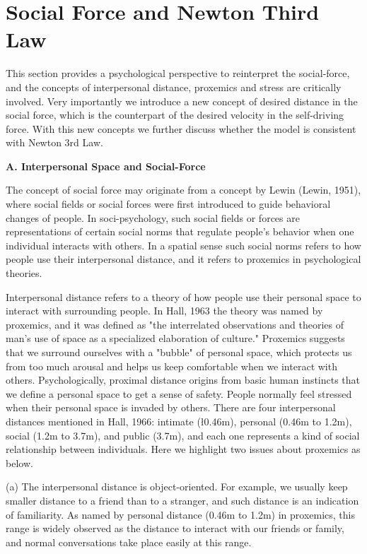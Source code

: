 \documentclass{article}
\begin{document}
\section{Social Force and Newton Third Law}

This section provides a psychological perspective to reinterpret the social-force, and the concepts of interpersonal distance, proxemics and stress are critically involved.  Very importantly we introduce a new concept of desired distance in the social force, which is the counterpart of the desired velocity in the self-driving force.  With this new concepts we further discuss whether the model is consistent with Newton 3rd Law.


\noindent \textbf{ A. Interpersonal Space and Social-Force}

The concept of social force may originate from a concept by Lewin (Lewin, 1951), where social fields or social forces were first introduced to guide behavioral changes of people.  In soci-psychology, such social fields or forces are representations of certain social norms that regulate people's behavior when one individual interacts with others.  In a spatial sense such social norms refers to how people use their interpersonal distance, and it refers to proxemics in psychological theories.

Interpersonal distance refers to a theory of how people use their personal space to interact with surrounding people.  In Hall, 1963 the theory was named by proxemics, and it was defined as "the interrelated observations and theories of man's use of space as a specialized elaboration of culture."  Proxemics suggests that we surround ourselves with a "bubble" of personal space, which protects us from too much arousal and helps us keep comfortable when we interact with others.  Psychologically, proximal distance origins from basic human instincts that we define a personal space to get a sense of safety.  People normally feel stressed when their personal space is invaded by others.  There are four interpersonal distances mentioned in Hall, 1966: intimate (\l 0.46m), personal (0.46m to 1.2m), social (1.2m to 3.7m), and public (\g 3.7m), and each one represents a kind of social relationship between individuals.  Here we highlight two issues about proxemics as below.

\noindent (a)  The interpersonal distance is object-oriented. For example, we usually keep smaller distance to a friend than to a stranger, and such distance is an indication of familiarity.  As named by personal distance (0.46m to 1.2m) in proxemics, this range is widely observed as the distance to interact with our friends or family, and normal conversations take place easily at this range.
\end{document}
